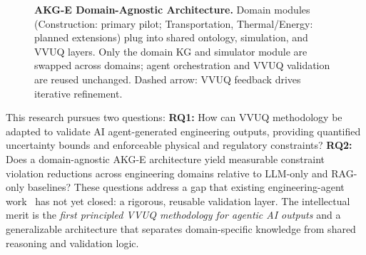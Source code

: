 \documentclass[conference, 10pt]{IEEEtran}
\begin{document}
\begin{figure}[t]
{
    }%
    \caption{\textbf{AKG-E Domain-Agnostic Architecture.} Domain modules (Construction: primary pilot; Transportation, Thermal/Energy: planned extensions) plug into shared ontology, simulation, and VVUQ layers. Only the domain KG and simulator module are swapped across domains; agent orchestration and VVUQ validation are reused unchanged. Dashed arrow: VVUQ feedback drives iterative refinement.}
    \label{fig:framework}
    \vspace{-0.5em}
\end{figure}

This research pursues two questions: \textbf{RQ1:} How can VVUQ methodology be adapted to validate AI agent-generated engineering outputs, providing quantified uncertainty bounds and enforceable physical and regulatory constraints? \textbf{RQ2:} Does a domain-agnostic AKG-E architecture yield measurable constraint violation reductions across engineering domains relative to LLM-only and RAG-only baselines? These questions address a gap that existing engineering-agent work~\cite{Park2026MCPSIM,LLMAgentsFEM2025} has not yet closed: a rigorous, reusable validation layer. The intellectual merit is the \textit{first principled VVUQ methodology for agentic AI outputs} and a generalizable architecture that separates domain-specific knowledge from shared reasoning and validation logic.
\end{document}
